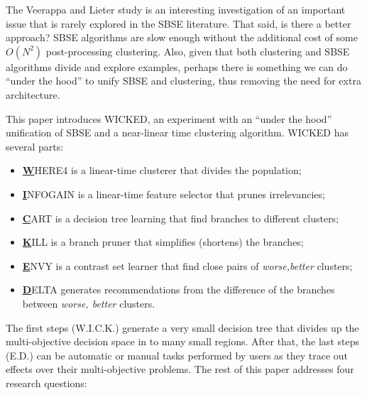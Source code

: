 \documentclass[runningheads]{llncs}
\newcommand{\bi}{\begin{itemize}}
\newcommand{\ei}{\end{itemize}}
\begin{document}
The Veerappa and Lieter study is an interesting investigation
of an important issue that is rarely explored in the SBSE literature.
That said, is there a better approach? 
SBSE algorithms are slow enough
without the additional cost of some 
 $O(N^2)$ post-processing clustering.
Also, given that both clustering and SBSE algorithms divide and explore
examples, perhaps there is something we can do ``under the hood'' to unify SBSE and
clustering, thus removing the need for  extra architecture.

This paper introduces WICKED, an experiment with an  ``under the hood'' unification of SBSE
and a near-linear time clustering algorithm. 
WICKED has several parts:
\bi
\item \underline{{\bf W}}HERE4 is a linear-time clusterer that divides the population;
\item \underline{{\bf I}}NFOGAIN is a linear-time feature selector that  prunes irrelevancies;
\item  \underline{{\bf C}}ART is a  decision tree learning that find branches to different clusters;
\item \underline{{\bf K}}ILL is a branch pruner that simplifies (shortens) the branches;
\item \underline{{\bf E}}NVY is a contrast set learner that  find close pairs of {\em worse,better} clusters;
\item \underline{{\bf D}}ELTA generates recommendations from the difference of the branches between {\em worse, better} clusters.
\ei
The first steps (W.I.C.K.)
generate a very small
decision tree that divides up the multi-objective decision space in to many small regions.
After that, the last steps (E.D.) can be automatic or manual tasks performed by users
as they trace out effects over their multi-objective problems.
The rest of this paper addresses four research questions:
\end{document}
